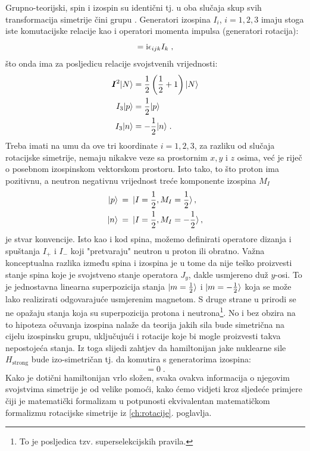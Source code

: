 Grupno-teorijski, spin i izospin su identični tj. u oba
slučaja skup svih transformacija simetrije čini grupu . 
Generatori izospina $I_i$, $i=1,2,3$ imaju stoga iste komutacijske relacije
kao i operatori momenta impulsa (generatori rotacija):
\begin{equation}
  [I_i, I_j] = \rmi \epsilon_{ijk} I_k  \;,
\end{equation}
što onda ima za posljedicu relacije svojstvenih vrijednosti:
\begin{align}
\vec{I}^2 \ket{N} &= \fhalf \left(\fhalf +1\right)  \ket{N} \\
I_3 \ket{p} &= \fhalf  \ket{p} \\
I_3 \ket{n} &= - \fhalf  \ket{n} \;.
\end{align}
Treba imati na umu da ove tri koordinate $i=1,2,3$, za razliku od
slučaja rotacijske simetrije, nemaju nikakve veze sa prostornim
$x, y$ i $z$ osima, već je riječ o posebnom izospinskom vektorskom prostoru.
Isto tako, to što proton ima pozitivnu, a neutron negativnu vrijednost
treće komponente izospina $M_I$
\begin{align}
   | p \rangle & \:=\: | I=\frac{1}{2}, M_I=\frac{1}{2} \rangle \,, \\
   | n \rangle & \:=\: | I=\frac{1}{2},M_I=-\frac{1}{2} \rangle \,,
\end{align}
je stvar konvencije.
Isto kao i kod spina, možemo definirati operatore dizanja i
spuštanja $I_+$ i $I_-$ koji "pretvaraju" neutron u proton
ili obratno. Važna konceptualna razlika između spina i izospina 
je u tome da nije teško proizvesti stanje spina koje je svojstveno
stanje operatora $J_y$, dakle usmjereno duž $y$-osi. To je jednostavna
linearna superpozicija stanja $| m=\frac{1}{2} \rangle$ i $| m=-\frac{1}{2} \rangle$ koja
se može lako realizirati odgovarajuće usmjerenim magnetom.
S druge strane u prirodi se ne opažaju stanja koja su superpozicija
protona i neutrona\footnote{To je posljedica tzv. superselekcijskih  pravila.}.
No i bez obzira na to hipoteza očuvanja izospina
nalaže da teorija jakih sila bude simetrična na cijelu izospinsku grupu,
uključujući i rotacije koje bi mogle proizvesti takva nepostojeća stanja.
Iz toga slijedi zahtjev da hamiltonijan
jake nuklearne sile $H_{\text{strong}}$ bude izo-simetričan tj. da komutira
s generatorima izospina:
\begin{equation}
   [H_{\text{strong}}, I_i] = 0 \;.
   \label{eq:HstrongI0}
\end{equation}
Kako je dotični hamiltonijan vrlo složen, svaka
ovakva informacija o njegovim svojstvima simetrije je od velike
pomoći, kako ćemo vidjeti kroz sljedeće primjere čiji je matematički
formalizam u potpunosti ekvivalentan matematičkom formalizmu
rotacijske simetrije iz \ref{ch:rotacije}. poglavlja.

